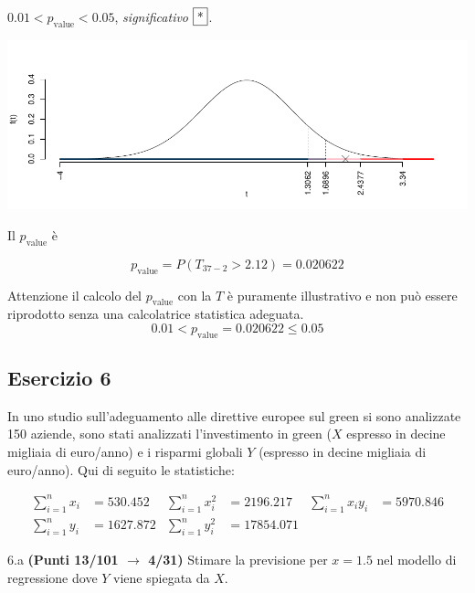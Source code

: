 \documentclass[
  11pt,
]{book}
\theoremstyle{mytheoremstyle}
\theoremstyle{mydefstyle}
\newenvironment{sol}
  {
  \begin{tcolorbox}[enhanced,breakable,arc=0.1mm,boxrule=1pt,colback=white,colframe=iblue,
  title=\bf \fontfamily{lmss}\selectfont \hspace{.5 cm} Soluzione,drop fuzzy shadow]

}{
\end{tcolorbox}
  }
\begin{document}
\begin{sol}
\(0.01<p_\text{value}<0.05\), \emph{significativo} \(\fbox{*}\).

\begin{center}\includegraphics{Esami_passati_con_soluzioni_files/figure-latex/2023-22,-1} \end{center}

Il \(p_{\text{value}}\) è

\[ p_{\text{value}} = P(T_{37-2}>2.12)=0.020622 \]

Attenzione il calcolo del \(p_\text{value}\) con la \(T\) è puramente illustrativo e non può essere riprodotto senza una calcolatrice statistica adeguata.\[
 0.01 < p_\text{value}= 0.020622 \leq 0.05 
\]

\end{sol}

\subsection{Esercizio 6}\label{esercizio-6-21}

In uno studio sull'adeguamento alle direttive europee sul green si sono analizzate 150 aziende, sono stati analizzati l'investimento in green (\(X\) espresso in decine migliaia di euro/anno) e i risparmi globali \(Y\) (espresso in decine migliaia di euro/anno). Qui di seguito le statistiche:

\begin{align*}
  \sum_{i=1}^n x_i &= 530.452 &\sum_{i=1}^n x_i^2 &= 2196.217 &\sum_{i=1}^n x_i y_i &= 5970.846\\
  \sum_{i=1}^n y_i &= 1627.872 & \sum_{i=1}^n y_i^2 &= 17854.071 &
\end{align*}

6.a \textbf{(Punti 13/101 \(\rightarrow\) 4/31)} Stimare la previsione per \(x=1.5\) nel modello di regressione dove \(Y\) viene spiegata da \(X\).
\end{document}
